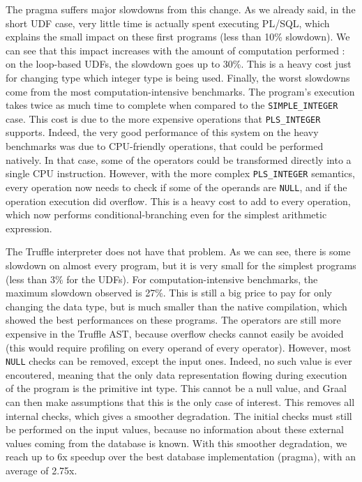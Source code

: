 \documentclass[twoside,11pt,a4paper]{article}
\newcommand{\java}[1]{\textsf{#1}}
\newcommand{\pls}[1]{\small\texttt{#1}\normalsize}
\newcommand{\plstype}[1]{\pls{#1}}
\newcommand{\plsi}{\plstype{PLS\_INTEGER}}
\newcommand{\simpleint}{\plstype{SIMPLE\_INTEGER}}
\newcommand{\plsnull}{\pls{NULL}}
\newcommand{\benchsystem}[1]{\textsf{#1}}
\newcommand{\pvm}{\benchsystem{pvm}}
\newcommand{\pvmg}{\benchsystem{pvm-pragma}}
\newcommand{\ncpg}{\benchsystem{pragma}}
\begin{document}

The \ncpg{} suffers major slowdowns from this change. As we already said, in the short UDF case, very little time is actually spent executing PL/SQL, which explains the small impact on these first programs (less than 10\% slowdown). We can see that this impact increases with the amount of computation performed : on the loop-based UDFs, the slowdown goes up to 30\%. This is a heavy cost just for changing type which integer type is being used. Finally, the worst slowdowns come from the most computation-intensive benchmarks. The program's execution takes twice as much time to complete when compared to the \simpleint{} case. This cost is due to the more expensive operations that \plsi{} supports. Indeed, the very good performance of this system on the heavy benchmarks was due to CPU-friendly operations, that could be performed natively. In that case, some of the operators could be transformed directly into a single CPU instruction. However, with the more complex \plsi{} semantics, every operation now needs to check if some of the operands are \plsnull{}, and if the operation execution did overflow. This is a heavy cost to add to every operation, which now performs conditional-branching even for the simplest arithmetic expression.

The Truffle interpreter does not have that problem. As we can see, there is some slowdown on almost every program, but it is very small for the simplest programs (less than 3\% for the UDFs). For computation-intensive benchmarks, the maximum slowdown observed is 27\%. This is still a big price to pay for only changing the data type, but is much smaller than the native compilation, which showed the best performances on these programs. The operators are still more expensive in the Truffle AST, because overflow checks cannot easily be avoided (this would require profiling on every operand of every operator). However, most \plsnull{} checks can be removed, except the input ones. Indeed, no such value is ever encoutered, meaning that the only data representation flowing during execution of the program is the primitive \java{int} type. This cannot be a null value, and Graal can then make assumptions that this is the only case of interest. This removes all internal checks, which gives a smoother degradation. The initial checks must still be performed on the input values, because no information about these external values coming from the database is known. With this smoother degradation, we reach up to 6x speedup over the best database implementation (\ncpg{}), with an average of 2.75x.
\end{document}
